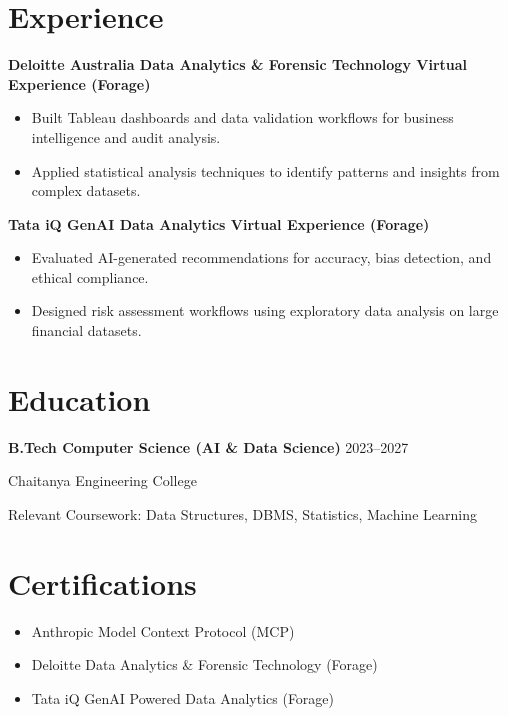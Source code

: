 \documentclass[11pt,a4paper]{article}
\begin{document}
\section*{Experience}

\textbf{Deloitte Australia Data Analytics \& Forensic Technology Virtual Experience (Forage)}

\begin{itemize}
\item Built Tableau dashboards and data validation workflows for business intelligence and audit analysis.
\item Applied statistical analysis techniques to identify patterns and insights from complex datasets.
\end{itemize}

\textbf{Tata iQ GenAI Data Analytics Virtual Experience (Forage)}

\begin{itemize}
\item Evaluated AI-generated recommendations for accuracy, bias detection, and ethical compliance.
\item Designed risk assessment workflows using exploratory data analysis on large financial datasets.
\end{itemize}


\section*{Education}

\textbf{B.Tech Computer Science (AI \& Data Science)}
\hfill 2023--2027

Chaitanya Engineering College

Relevant Coursework: Data Structures, DBMS, Statistics, Machine Learning


\section*{Certifications}

\begin{itemize}
\item Anthropic Model Context Protocol (MCP)
\item Deloitte Data Analytics \& Forensic Technology (Forage)
\item Tata iQ GenAI Powered Data Analytics (Forage)
\end{itemize}
\end{document}
